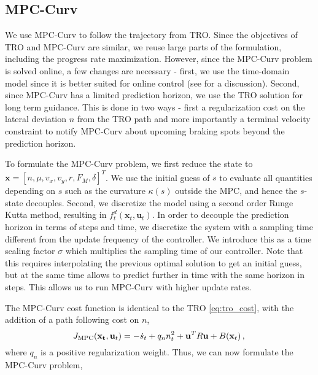 \subsection{MPC-Curv}
\label{sec:mpc}
We use MPC-Curv to follow the trajectory from TRO. Since the objectives of TRO and MPC-Curv are similar, we reuse large parts of the formulation, including the progress rate maximization. However, since the MPC-Curv problem is solved online, a few changes are necessary - first, we use the time-domain model since it is better suited for online control (see \cite{vazquez2020optimization} for a discussion). Second, since MPC-Curv has a limited prediction horizon, we use the TRO solution for long term guidance. This is done in two ways - first a regularization cost on the lateral deviation $n$ from the TRO path and more importantly a terminal velocity constraint to notify MPC-Curv about upcoming braking spots beyond the prediction horizon. 

To formulate the MPC-Curv problem, we first reduce the state to $\mathbf{x} = [n,\mu,v_x,v_y,r,F_M,\delta]^T$. We use the initial guess of $s$ to evaluate all quantities depending on $s$ such as the curvature $\kappa(s)$ outside the MPC, and hence the $s$-state decouples. Second, we discretize the model using a second order Runge Kutta method, resulting in $f_t^d(\mathbf{x}_t, \mathbf{u}_t)$. In order to decouple the prediction horizon in terms of steps and time, we discretize the system with a sampling time different from the update frequency of the controller. We introduce this as a time scaling factor $\sigma$ which multiplies the sampling time of our controller. Note that this requires interpolating the previous optimal solution to get an initial guess, but at the same time allows to predict further in time with the same horizon in steps. This allows us to run MPC-Curv with higher update rates.

The MPC-Curv cost function is identical to the TRO \eqref{eq:tro_cost}, with the addition of a path following cost on $n$, 
\begin{equation}
J_{\rm{MPC}}(\mathbf{{x}_t}, \mathbf{u}_t) = -\dot{s}_t + q_n n_t^2 + \mathbf{u}^T R \mathbf{u} + B(\mathbf{x}_t) \,,\\
\end{equation}
where $q_n$ is a positive regularization weight. Thus, we can now formulate the MPC-Curv problem, 


